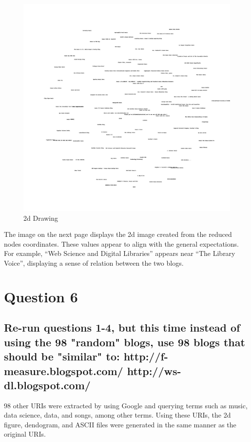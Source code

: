 \documentclass[11pt]{scrartcl} %
\begin{document}
\begin{figure}[p]%
        \includegraphics[width=.99\textwidth,height=.99\textheight]{../Figures/blogs2d.jpg}%
        \caption{2d Drawing}
    \end{figure}%

\bigskip \bigskip
\tabto{2.0cm} The image on the next page displays the 2d image created from the reduced nodes coordinates. These values appear to align with the general expectations. For example, ``Web Science and Digital Libraries'' appears near ``The Library Voice'', displaying a sense of relation between the two blogs.

\pagebreak
\section*{Question 6}


\subsection*{Re-run questions 1-4, but this time instead of using the 98 
"random" blogs, use 98 blogs that should be "similar" to:
http://f-measure.blogspot.com/
http://ws-dl.blogspot.com/}

\tabto{2.0cm} 98 other URIs were extracted by using Google and querying terms such as music, data science, data, and songs, among other terms. Using these URIs, the 2d figure, dendogram, and ASCII files were generated in the same manner as the original URIs. \newline \newline
\end{document}
